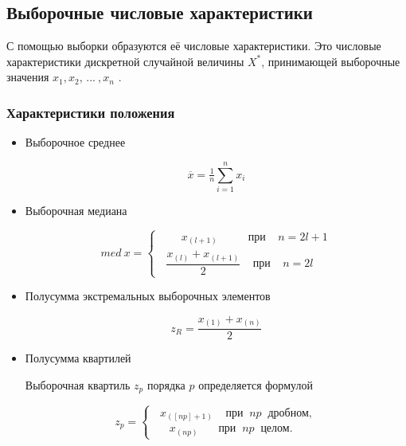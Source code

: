 \subsection{Выборочные числовые характеристики}

С помощью выборки образуются её числовые характеристики. Это числовые характеристики дискретной случайной величины $X^*$, принимающей выборочные значения $x_1, x_2, \, ... \: , x_n$ \cite[с. 411]{b:probSectMath}.

\subsubsection{Характеристики положения}

\begin{itemize}
  \item Выборочное среднее
  
  \begin{equation} \label{eq:mean}
    \overline{x} = \tfrac{1}{n}\sum\limits_{i=1}^n x_i
  \end{equation}
  
  \item Выборочная медиана
  
  \begin{equation} \label{eq:med}
    med \: x = 
    \begin{cases} 
        \;\;\;\;\;\;\; x_{(l+1)} \:\;\;\;\;\;\;\;\;\; \text{при} \;\;\;\; n = 2l + 1\\
        \;\; \dfrac{x_{(l)} + x_{(l+1)}}{2} \;\;\;\; \text{при} \;\;\;\; n = 2l
    \end{cases}
  \end{equation}
  
  \item Полусумма экстремальных выборочных элементов
  
  \begin{equation} \label{eq:zR}
    z_R = \dfrac{x_{(1)} + x_{(n)}}{2}
  \end{equation}
  
  \item Полусумма квартилей
  
  Выборочная квартиль $z_p$ порядка $p$ определяется формулой
  
   \begin{equation}
    z_p =
    \begin{cases}
        \;\; x_{([np]+1)} \;\;\;\; \text{при} \;\; np \;\; \text{дробном},\\
        \;\;\;\;\; x_{(np)} \,\:\;\;\;\;\; \text{при} \;\; np \;\; \text{целом}.
    \end{cases}
  \end{equation}
  

\end{itemize}
